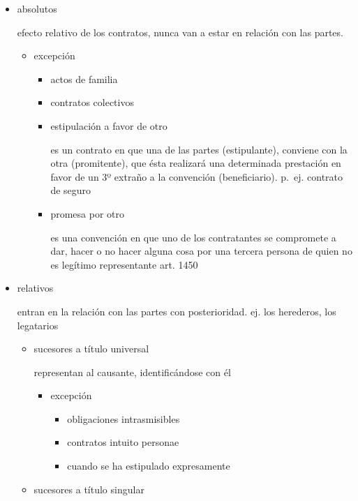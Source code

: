 \documentclass[]{article}
\providecommand{\tightlist}{%
  \setlength{\itemsep}{0pt}\setlength{\parskip}{0pt}}
\begin{document}
\begin{itemize}
\begin{itemize}
    \begin{itemize}
    \item
      absolutos

      efecto relativo de los contratos, nunca van a estar en relación
      con las partes.

      \begin{itemize}
      \tightlist
      \item
        excepción

        \begin{itemize}
        \item
          actos de familia
        \item
          contratos colectivos
        \item
          estipulación a favor de otro

          es un contrato en que una de las partes (estipulante),
          conviene con la otra (promitente), que ésta realizará una
          determinada prestación en favor de un 3º extraño a la
          convención (beneficiario). p.~ej. contrato de seguro
        \item
          promesa por otro

          es una convención en que uno de los contratantes se compromete
          a dar, hacer o no hacer alguna cosa por una tercera persona de
          quien no es legítimo representante art. 1450
        \end{itemize}
      \end{itemize}
    \item
      relativos

      entran en la relación con las partes con posterioridad. ej. los
      herederos, los legatarios

      \begin{itemize}
      \item
        sucesores a título universal

        representan al causante, identificándose con él

        \begin{itemize}
        \tightlist
        \item
          excepción

          \begin{itemize}
          \tightlist
          \item
            obligaciones intrasmisibles
          \item
            contratos intuito personae
          \item
            cuando se ha estipulado expresamente
          \end{itemize}
        \end{itemize}
      \item
        sucesores a título singular


\end{itemize}
\end{itemize}
\end{itemize}
\end{itemize}
\end{document}

